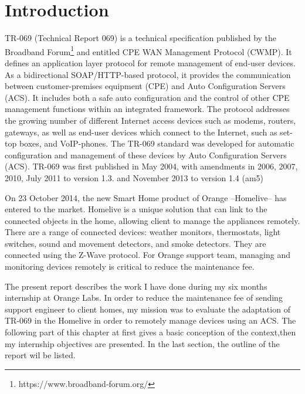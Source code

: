 
\chapter{Introduction} %

\label{Chapter1} %



TR-069 (Technical Report 069) is a technical specification published by the Broadband Forum\footnote{https://www.broadband-forum.org/} and entitled CPE WAN Management Protocol (CWMP)\cite{tr069}. It defines an application layer protocol for remote management of end-user devices. As a bidirectional SOAP/HTTP-based protocol, it provides the communication between customer-premises equipment (CPE) and Auto Configuration Servers (ACS). It includes both a safe auto configuration and the control of other CPE management functions within an integrated framework. The protocol addresses the growing number of different Internet access devices such as modems, routers, gateways, as well as end-user devices which connect to the Internet, such as set-top boxes, and VoIP-phones. The TR-069 standard was developed for automatic configuration and management of these devices by Auto Configuration Servers (ACS). TR-069 was first published in May 2004, with amendments in 2006, 2007, 2010, July 2011 to version 1.3. and November 2013 to version 1.4 (am5)

On 23 October 2014, the new Smart Home product of Orange --Homelive-- has entered to the market. Homelive is a unique solution that can link to the connected objects in the home, allowing client to manage the appliances remotely. There are a range of connected devices: weather monitors, thermostats, light switches, sound and movement detectors, and smoke detectors. They are connected using the Z-Wave protocol. For Orange support team, managing and monitoring devices remotely is critical to reduce the maintenance fee.

The present report describes the work I have done during my six months internship at Orange Labs. In order to reduce the maintenance fee of sending support engineer to client homes, my mission was to evaluate the adaptation of TR-069 in the Homelive in order to remotely manage devices using an ACS. The following part of this chapter at first gives a basic conception of the context,then my internship objectives are presented. In the last section, the outline of the report wil be listed.

